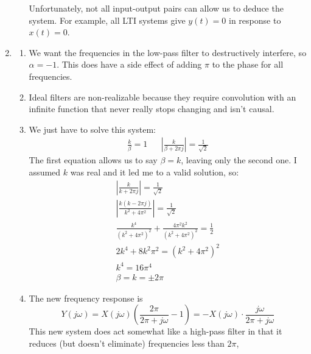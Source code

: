 \documentclass[12pt]{article}
\begin{document}
\begin{enumerate}
\begin{enumerate}
                        Unfortunately, not all input-output pairs can allow us
                        to deduce the system.
                        For example, all LTI systems give $y(t)=0$ in response to $x(t)=0$.
            \end{enumerate}
      \item \begin{enumerate}
                  \item We want the frequencies in the low-pass filter to destructively interfere, so $\alpha=-1$.
                        This does have a side effect of adding $\pi$ to the phase for all frequencies.
                  \item Ideal filters are non-realizable because they require convolution
                        with an infinite function that never really stops changing and isn't causal.
                  \item We just have to solve this system:
                        \begin{align*}
                              \frac{k}{\beta}=1 &  & \left|\frac{k}{\beta+2\pi j}\right|=\frac{1}{\sqrt{2}}
                        \end{align*}
                        The first equation allows us to say $\beta=k$, leaving only the second one.
                        I assumed $k$ was real and it led me to a valid solution, so:
                        \begin{gather*}
                              \left|\frac{k}{k+2\pi j}\right|=\frac{1}{\sqrt{2}} \\
                              \left|\frac{k(k-2\pi j)}{k^2+4\pi^2}\right|=\frac{1}{\sqrt{2}} \\
                              \frac{k^4}{\left(k^2+4\pi^2\right)^2}+\frac{4\pi^2k^2}{\left(k^2+4\pi^2\right)^2}=\frac{1}{2} \\
                              2k^4+8k^2\pi^2=\left(k^2+4\pi^2\right)^2 \\
                              k^4=16\pi^4 \\
                              \boxed{\beta=k=\pm 2\pi}
                        \end{gather*}
                  \item The new frequency response is
                        \[Y(j\omega)=X(j\omega)\left(\frac{2\pi}{2\pi+j\omega}-1\right)=-X(j\omega) \cdot \frac{j\omega}{2\pi+j\omega}\]
                        This new system does act somewhat like a high-pass filter in that it
                        reduces (but doesn't eliminate) frequencies less than $2\pi$,

\end{enumerate}
\end{enumerate}
\end{document}
